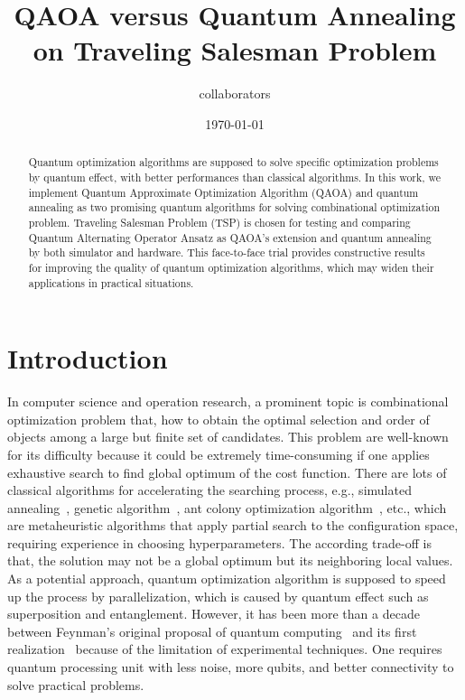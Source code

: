 \documentclass[aps,pra,twocolumn,superscriptaddress]{revtex4-2}
\begin{document}
\title{QAOA versus Quantum Annealing on Traveling Salesman Problem}


\author{collaborators}


\date{\today}


\begin{abstract}
Quantum optimization algorithms are supposed to solve specific optimization problems by quantum effect, with better performances than classical algorithms. In this work, we implement Quantum Approximate Optimization Algorithm (QAOA) and quantum annealing as two promising quantum algorithms for solving combinational optimization problem. Traveling Salesman Problem (TSP) is chosen for testing and comparing Quantum Alternating Operator Ansatz as QAOA's extension and quantum annealing by both simulator and hardware. This face-to-face trial provides constructive results for improving the quality of quantum optimization algorithms, which may widen their applications in practical situations.
\end{abstract}


\maketitle
\section{Introduction}
In computer science and operation research, a prominent topic is combinational optimization problem that, how to obtain the optimal selection and order of objects among a large but finite set of candidates. This problem are well-known for its difficulty because it could be extremely time-consuming if one applies exhaustive search to find global optimum of the cost function. There are lots of classical algorithms for accelerating the searching process, e.g., simulated annealing~\cite{sa}, genetic algorithm~\cite{ga}, ant colony optimization algorithm~\cite{aco}, etc., which are metaheuristic algorithms that apply partial search to the configuration space, requiring experience in choosing hyperparameters. The according trade-off is that, the solution may not be a global optimum but its neighboring local values. As a potential approach, quantum optimization algorithm is supposed to speed up the process by parallelization, which is caused by quantum effect such as superposition and entanglement. However, it has been more than a decade between Feynman's original proposal of quantum computing~\cite{feynman} and its first realization~\cite{firstexp} because of the limitation of experimental techniques. One requires quantum processing unit with less noise, more qubits, and better connectivity to solve practical problems.
\end{document}
